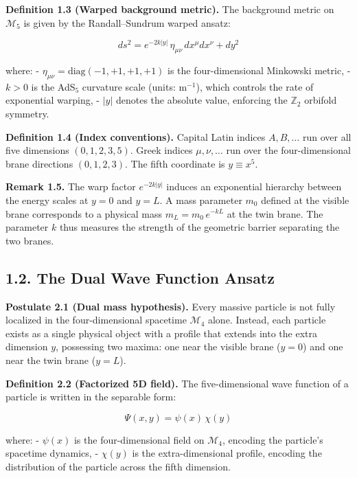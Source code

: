 \documentclass[
  11pt,
]{article}
\begin{document}
\textbf{Definition 1.3 (Warped background metric).} The background
metric on \(\mathcal{M}_5\) is given by the Randall--Sundrum warped
ansatz:

\[ds^2 = e^{-2k|y|}\,\eta_{\mu\nu}\,dx^\mu dx^\nu + dy^2 \tag{5}\]

where: - \(\eta_{\mu\nu} = \mathrm{diag}(-1, +1, +1, +1)\) is the
four-dimensional Minkowski metric, - \(k > 0\) is the AdS\(_5\)
curvature scale (units: m\(^{-1}\)), which controls the rate of
exponential warping, - \(|y|\) denotes the absolute value, enforcing the
\(\mathbb{Z}_2\) orbifold symmetry.

\textbf{Definition 1.4 (Index conventions).} Capital Latin indices
\(A, B, \ldots\) run over all five dimensions \((0,1,2,3,5)\). Greek
indices \(\mu, \nu, \ldots\) run over the four-dimensional brane
directions \((0,1,2,3)\). The fifth coordinate is \(y \equiv x^5\).

\textbf{Remark 1.5.} The warp factor \(e^{-2k|y|}\) induces an
exponential hierarchy between the energy scales at \(y = 0\) and
\(y = L\). A mass parameter \(m_0\) defined at the visible brane
corresponds to a physical mass \(m_L = m_0\,e^{-kL}\) at the twin brane.
The parameter \(k\) thus measures the strength of the geometric barrier
separating the two branes.

\bigskip

\hypertarget{the-dual-wave-function-ansatz}{%
\subsection{1.2. The Dual Wave Function
Ansatz}\label{the-dual-wave-function-ansatz}}

\textbf{Postulate 2.1 (Dual mass hypothesis).} Every massive particle is
not fully localized in the four-dimensional spacetime \(\mathcal{M}_4\)
alone. Instead, each particle exists as a single physical object with a
profile that extends into the extra dimension \(y\), possessing two
maxima: one near the visible brane (\(y = 0\)) and one near the twin
brane (\(y = L\)).

\textbf{Definition 2.2 (Factorized 5D field).} The five-dimensional wave
function of a particle is written in the separable form:

\[\Psi(x, y) = \psi(x)\,\chi(y) \tag{6}\]

where: - \(\psi(x)\) is the four-dimensional field on \(\mathcal{M}_4\),
encoding the particle's spacetime dynamics, - \(\chi(y)\) is the
extra-dimensional profile, encoding the distribution of the particle
across the fifth dimension.
\end{document}
